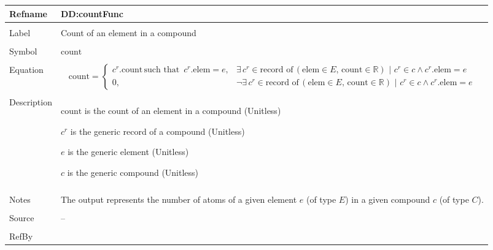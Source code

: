 \documentclass[12pt]{article}
\begin{document}
\begin{minipage}{\textwidth}
\begin{tabular}{>{\raggedright}p{}>{\raggedright\arraybackslash}p{}}
\toprule \textbf{Refname} & \textbf{DD:countFunc}
\label{DD:countFunc}
\\ \midrule \\
Label & Count of an element in a compound
        
\\ \midrule \\
Symbol & $\text{count}$
         
\\ \midrule \\
Equation & \begin{displaymath}
           \text{count}=\begin{cases}
                        {c^{r}}\text{.count}\,\text{such that }\,{c^{r}}\text{.elem}=e, & \exists{}\,{{c^{r}}\in{}\text{record of}\,\left(\text{elem}\in{}E,\,\text{count}\in{}\mathbb{R}\right)}\text{ | }{c^{r}}\in{}c\land{}{c^{r}}\text{.elem}=e\\
                        0, & \neg{}\exists{}\,{{c^{r}}\in{}\text{record of}\,\left(\text{elem}\in{}E,\,\text{count}\in{}\mathbb{R}\right)}\text{ | }{c^{r}}\in{}c\land{}{c^{r}}\text{.elem}=e
                        \end{cases}
           \end{displaymath}
\\ \midrule \\
Description & \begin{symbDescription}
              \item{$\text{count}$ is the count of an element in a compound (Unitless)}
              \item{${c^{r}}$ is the generic record of a compound (Unitless)}
              \item{$e$ is the generic element (Unitless)}
              \item{$c$ is the generic compound (Unitless)}
              \end{symbDescription}
\\ \midrule \\
Notes & The output represents the number of atoms of a given element $e$ (of type $E$) in a given compound $c$ (of type $C$).
        
\\ \midrule \\
Source & --
         
\\ \midrule \\
RefBy & 
\\ \bottomrule
\end{tabular}
\end{minipage}
\end{document}
